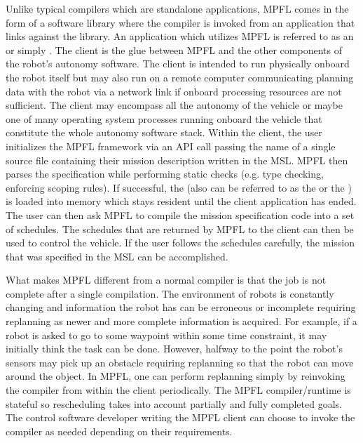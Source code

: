 

Unlike typical compilers which are standalone applications, MPFL comes in the form of a software library where the compiler is invoked from an application that links against the library. An application which utilizes MPFL is referred to as an  or simply . The client is the glue between MPFL and the other components of the robot's autonomy software. The client is intended to run physically onboard the robot itself but may also run on a remote computer communicating planning data with the robot via a network link if onboard processing resources are not sufficient. The client may encompass all the autonomy of the vehicle or maybe one of many operating system processes running onboard the vehicle that constitute the whole autonomy software stack. Within the client, the user initializes the MPFL framework via an API call passing the name of a single source file containing their mission description written in the MSL. MPFL then parses the specification while performing static checks (e.g. type checking, enforcing scoping rules). If successful, the  (also can be referred to as the  or the ) is loaded into memory which stays resident until the client application has ended. The user can then ask MPFL to compile the mission specification code into a set of schedules. The schedules that are returned by MPFL to the client can then be used to control the vehicle. If the user follows the schedules carefully, the mission that was specified in the MSL can be accomplished.

What makes MPFL different from a normal compiler is that the job is not complete after a single compilation. The environment of robots is constantly changing and information the robot has can be erroneous or incomplete requiring replanning as newer and more complete information is acquired. For example, if a robot is asked to go to some waypoint within some time constraint, it may initially think the task can be done. However, halfway to the point the robot's sensors may pick up an obstacle requiring replanning so that the robot can move around the object. In MPFL, one can perform replanning simply by reinvoking the compiler from within the client periodically. The MPFL compiler/runtime is stateful so rescheduling takes into account partially and fully completed goals. The control software developer writing the MPFL client can choose to invoke the compiler as needed depending on their requirements.

